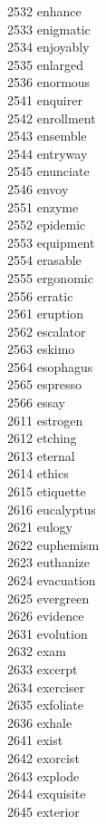 2532 enhance \\
2533 enigmatic \\
2534 enjoyably \\
2535 enlarged \\
2536 enormous \\
2541 enquirer \\
2542 enrollment \\
2543 ensemble \\
2544 entryway \\
2545 enunciate \\
2546 envoy \\
2551 enzyme \\
2552 epidemic \\
2553 equipment \\
2554 erasable \\
2555 ergonomic \\
2556 erratic \\
2561 eruption \\
2562 escalator \\
2563 eskimo \\
2564 esophagus \\
2565 espresso \\
2566 essay \\
2611 estrogen \\
2612 etching \\
2613 eternal \\
2614 ethics \\
2615 etiquette \\
2616 eucalyptus \\
2621 eulogy \\
2622 euphemism \\
2623 euthanize \\
2624 evacuation \\
2625 evergreen \\
2626 evidence \\
2631 evolution \\
2632 exam \\
2633 excerpt \\
2634 exerciser \\
2635 exfoliate \\
2636 exhale \\
2641 exist \\
2642 exorcist \\
2643 explode \\
2644 exquisite \\
2645 exterior \\
